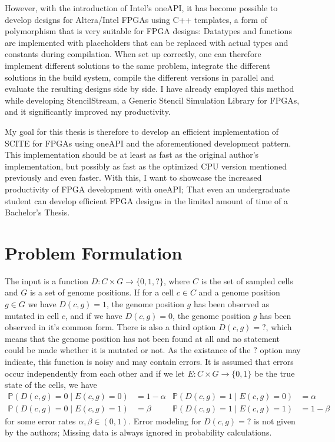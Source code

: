 However, with the introduction of Intel's oneAPI, it has become possible to develop designs for Altera/Intel \acp{FPGA} using C++ templates, a form of polymorphism that is very suitable for \ac{FPGA} designs: Datatypes and functions are implemented with placeholders that can be replaced with actual types and constants during compilation. When set up correctly, one can therefore implement different solutions to the same problem, integrate the different solutions in the build system, compile the different versions in parallel and evaluate the resulting designs side by side. I have already employed this method while developing StencilStream, a Generic Stencil Simulation Library for \acp{FPGA}, and it significantly improved my productivity.

My goal for this thesis is therefore to develop an efficient implementation of SCITE for \acp{FPGA} using oneAPI and the aforementioned development pattern. This implementation should be at least as fast as the original author's implementation, but possibly as fast as the optimized CPU version mentioned previously and even faster. With this, I want to showcase the increased productivity of \ac{FPGA} development with oneAPI; That even an undergraduate student can develop efficient FPGA designs in the limited amount of time of a Bachelor's Thesis.

\section{Problem Formulation}

The input is a function $D: C \times G \rightarrow \{0, 1, ?\}$, where $C$ is the set of sampled cells and $G$ is a set of genome positions. If for a cell $c \in C$ and a genome position $g \in G$ we have $D(c, g) = 1$, the genome position $g$ has been observed as mutated in cell $c$, and if we have $D(c, g) = 0$, the genome position $g$ has been observed in it's common form. There is also a third option $D(c, g) = ?$, which means that the genome position has not been found at all and no statement could be made whether it is mutated or not. As the existance of the $?$ option may indicate, this function is noisy and may contain errors. It is assumed that errors occur independently from each other and if we let $E: C \times G \rightarrow \{0, 1\}$ be the true state of the cells, we have
\begin{align*}
    \mathbb{P}(D(c, g) = 0 \mid E(c, g) = 0) &= 1 - \alpha & \mathbb{P}(D(c, g) = 1 \mid E(c, g) = 0) &= \alpha \\
    \mathbb{P}(D(c, g) = 0 \mid E(c, g) = 1) &= \beta & \mathbb{P}(D(c, g) = 1 \mid E(c, g) = 1) &= 1 - \beta
\end{align*}
for some error rates $\alpha, \beta \in (0, 1)$. Error modeling for $D(c, g) = ?$ is not given by the authors; Missing data is always ignored in probability calculations.

